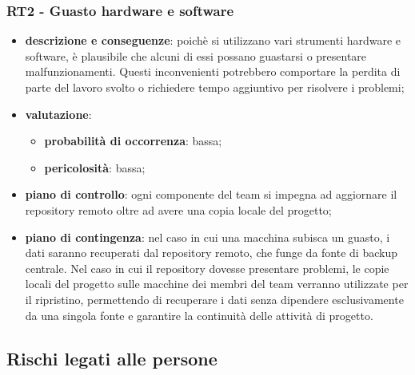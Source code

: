     \subsubsection{RT2 - Guasto hardware e software} \label{sec:RT2}
        \begin{itemize}
            \item \textbf{descrizione e conseguenze}: poichè si utilizzano vari strumenti hardware e software, è plausibile che alcuni di essi possano guastarsi o presentare malfunzionamenti. Questi inconvenienti potrebbero comportare la perdita di parte del lavoro svolto o richiedere tempo aggiuntivo per risolvere i problemi;
            \item \textbf{valutazione}:
            \begin{itemize} 
                \item \textbf{probabilità di occorrenza}: bassa;
                \item \textbf{pericolosità}: bassa;
            \end{itemize}
            \item \textbf{piano di controllo}: ogni componente del team si impegna ad aggiornare il repository remoto oltre ad avere una copia locale del progetto;
            \item \textbf{piano di contingenza}: nel caso in cui una macchina subisca un guasto, i dati saranno recuperati dal repository remoto, che funge da fonte di backup centrale. Nel caso in cui il repository dovesse presentare problemi, le copie locali del progetto sulle macchine dei membri del team verranno utilizzate per il ripristino, permettendo di recuperare i dati senza dipendere esclusivamente da una singola fonte e garantire la continuità delle attività di progetto.
        \end{itemize}

    
\subsection{Rischi legati alle persone} %

